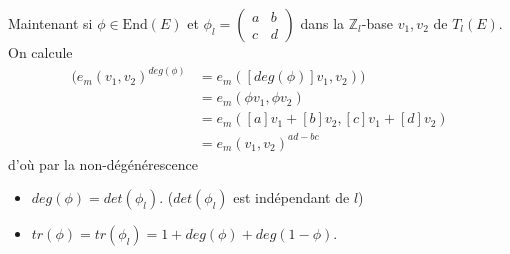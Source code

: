\documentclass[12pt]{article}
\newcommand{\Z}{\mathbb{Z}}
\newcommand{\End}{\textrm{End}}
\begin{document}
Maintenant si $\phi\in \End(E)$ et $\phi_l=\begin{pmatrix} a&b\\ c&d\end{pmatrix}$ dans la $\Z_l$-base $v_1,v_2$ de $T_l(E)$.
On calcule \begin{align*}
    (e_m(v_1,v_2)^{deg(\phi)}&=e_m([deg(\phi)]v_1,v_2))\\
       &=e_m(\phi v_1,\phi v_2) \\
       &=e_m([a]v_1+[b]v_2,[c]v_1+[d]v_2)\\
       &=e_m(v_1,v_2)^{ad-bc}
\end{align*}
d'où par la non-dégénérescence 
\begin{itemize}
    \item $deg(\phi)=det(\phi_l)$. ($det(\phi_l)$ est indépendant de $l$)
    \item $tr(\phi)=tr(\phi_l)=1+deg(\phi)+deg(1-\phi)$.
\end{itemize}
\end{document}
